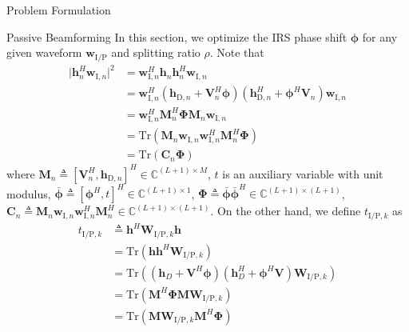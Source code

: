 \documentclass[journal]{IEEEtran}
\begin{document}
\begin{section}{Problem Formulation}
		\begin{subsection}{Passive Beamforming}
			In this section, we optimize the IRS phase shift $\boldsymbol{\phi}$ for any given waveform $\boldsymbol{w}_{\mathrm{I/P}}$ and splitting ratio $\rho$. Note that
			\begin{align}
				\lvert \boldsymbol{h}_{n}^H\boldsymbol{w}_{\mathrm{I},n} \rvert^2
				& = \boldsymbol{w}_{\mathrm{I},n}^H\boldsymbol{h}_n\boldsymbol{h}_n^H\boldsymbol{w}_{\mathrm{I},n}\nonumber\\
				& = \boldsymbol{w}_{\mathrm{I},n}^H(\boldsymbol{h}_{\mathrm{D},n}+\boldsymbol{V}_n^H\boldsymbol{\phi})(\boldsymbol{h}_{\mathrm{D},n}^H+\boldsymbol{\phi}^H\boldsymbol{V}_n)\boldsymbol{w}_{\mathrm{I},n}\nonumber\\
				& = \boldsymbol{w}_{\mathrm{I},n}^H\boldsymbol{M}_n^H\boldsymbol{\Phi}\boldsymbol{M}_n\boldsymbol{w}_{\mathrm{I},n}\nonumber\\
				& = \mathrm{Tr}(\boldsymbol{M}_n\boldsymbol{w}_{\mathrm{I},n}\boldsymbol{w}_{\mathrm{I},n}^H\boldsymbol{M}_n^H\boldsymbol{\Phi})\nonumber\\
				& = \mathrm{Tr}(\boldsymbol{C}_n\boldsymbol{\Phi})
			\end{align}
			where $\boldsymbol{M}_n \triangleq [\boldsymbol{V}_n^H, \boldsymbol{h}_{\mathrm{D},n}]^H \in \mathbb{C}^{(L+1) \times M}$, $t$ is an auxiliary variable with unit modulus, $\bar{\boldsymbol{\phi}} \triangleq [\boldsymbol{\phi}^H, t]^H \in \mathbb{C}^{(L+1) \times 1}$, $\boldsymbol{\Phi} \triangleq \bar{\boldsymbol{\phi}}\bar{\boldsymbol{\phi}}^H \in \mathbb{C}^{(L+1) \times (L+1)}$, $\boldsymbol{C}_n \triangleq \boldsymbol{M}_n\boldsymbol{w}_{\mathrm{I},n}\boldsymbol{w}_{\mathrm{I},n}^H\boldsymbol{M}_n^H \in \mathbb{C}^{(L+1)\times(L+1)}$. On the other hand, we define $t_{\mathrm{I/P},k}$ as
			\begin{align}
				t_{\mathrm{I/P},k}
				& \triangleq \boldsymbol{h}^H\boldsymbol{W}_{\mathrm{I/P},k}\boldsymbol{h}\nonumber\\
				& = \mathrm{Tr}(\boldsymbol{h}\boldsymbol{h}^H\boldsymbol{W}_{\mathrm{I/P},k})\nonumber\\
				& = \mathrm{Tr}\left((\boldsymbol{h}_{D}+\boldsymbol{V}^H\boldsymbol{\phi})(\boldsymbol{h}_{D}^H+\boldsymbol{\phi}^H\boldsymbol{V})\boldsymbol{W}_{\mathrm{I/P},k}\right)\nonumber\\
				& = \mathrm{Tr}(\boldsymbol{M}^H\boldsymbol{\Phi}\boldsymbol{M}\boldsymbol{W}_{\mathrm{I/P},k})\nonumber\\
				& = \mathrm{Tr}(\boldsymbol{M}\boldsymbol{W}_{\mathrm{I/P},k}\boldsymbol{M}^H\boldsymbol{\Phi})\nonumber\\

\end{align}
\end{subsection}
\end{section}
\end{document}
